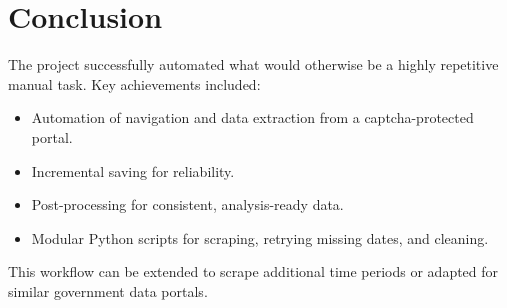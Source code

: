 \documentclass[12pt]{article}
\begin{document}
\section*{Conclusion}
The project successfully automated what would otherwise be a highly repetitive manual task.  
Key achievements included:
\begin{itemize}
    \item Automation of navigation and data extraction from a captcha-protected portal.
    \item Incremental saving for reliability.
    \item Post-processing for consistent, analysis-ready data.
    \item Modular Python scripts for scraping, retrying missing dates, and cleaning.
\end{itemize}
This workflow can be extended to scrape additional time periods or adapted for similar government data portals.
\end{document}
